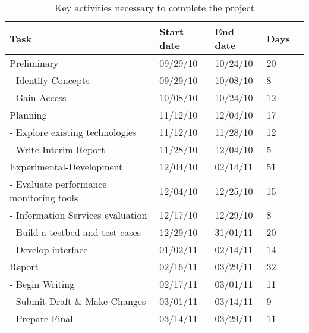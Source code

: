 \begin{table}[ht]
\begin{tabular}{ | l | l | l | l | r |}
\hline
Task & Start date & End date & Days \\ \hline
  Preliminary & 09/29/10 & 10/24/10 & 20 \\ \hline 
  -  Identify Concepts & 09/29/10 & 10/08/10 & 8 \\ \hline 
  -  Gain Access & 10/08/10 & 10/24/10 & 12 \\ \hline 
  Planning & 11/12/10 & 12/04/10 & 17 \\ \hline 
  -  Explore existing technologies & 11/12/10 & 11/28/10 & 12 \\ \hline 
  -  Write Interim Report & 11/28/10 & 12/04/10 & 5 \\ \hline 
  Experimental-Development & 12/04/10 & 02/14/11 & 51 \\ \hline 
  -  Evaluate performance monitoring tools & 12/04/10 & 12/25/10 & 15 \\ \hline 
  -  Information Services evaluation & 12/17/10 & 12/29/10 & 8 \\ \hline 
  -  Build a testbed and test cases & 12/29/10 & 31/01/11 & 20 \\ \hline 
  -  Develop interface & 01/02/11 & 02/14/11 & 14 \\ \hline 
  Report & 02/16/11 & 03/29/11 & 32 \\ \hline 
  -  Begin Writing & 02/17/11 & 03/01/11 & 11 \\ \hline 
  -  Submit Draft \& Make Changes & 03/01/11 & 03/14/11 & 9 \\ \hline 
  -  Prepare Final & 03/14/11 & 03/29/11 & 11 \\ \hline 
\end{tabular}
\caption{Key activities necessary to complete the project}
\label{tab:tasks}
\end{table}



